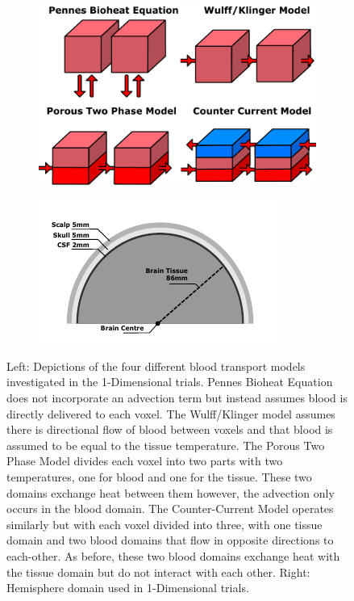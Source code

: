 \documentclass[11pt,english,a4paper,twoside,openright]{report}
\begin{document}
{{{{{{{{\begin{figure}[h]
	\centering
	\begin{subfigure}[b]{0.49\textwidth}
		\includegraphics[width=\textwidth]{Thesis/drawing}
	\end{subfigure}
	\begin{subfigure}[b]{0.49\textwidth}
		\includegraphics[width=\textwidth]{1DHemisphere/hemisphere2}
	\end{subfigure}
	\caption[Schematic for the various models and the domains used in the 1-Dimensional trials]{Left: Depictions of the four different blood transport models investigated in the 1-Dimensional trials. Pennes Bioheat Equation does not incorporate an advection term but instead assumes blood is directly delivered to each voxel. The Wulff/Klinger model assumes there is directional flow of blood between voxels and that blood is assumed to be equal to the tissue temperature. The Porous Two Phase Model divides each voxel into two parts with two temperatures, one for blood and one for the tissue. These two domains exchange heat between them however, the advection only occurs in the blood domain. The Counter-Current Model operates similarly but with each voxel divided into three, with one tissue domain and two blood domains that flow in opposite directions to each-other. As before, these two blood domains exchange heat with the tissue domain but do not interact with each other.  Right: Hemisphere domain used in 1-Dimensional trials.}
	\label{fig:1DHemisphere}
\end{figure}

}}}}}}}}
\end{document}
